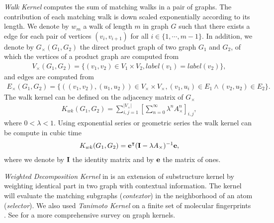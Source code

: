 {%
\textit{Walk Kernel} \citep{Kashima03marginalized,Gartner03a} computes the sum of matching walks in a pair of graphs. 
The contribution of each matching walk is down scaled exponentially according to its length.  
We denote by $w_m$ a walk of length $m$ in graph $G$ such that there exists a edge for each pair of vertices $(v_i,v_{i+1})$ for all $i\in\{1,\cdots,m-1\}$.
In addition, we denote by $G_{\times}(G_1,G_2)$ the direct product graph of two graph $G_1$ and $G_2$, of which the vertices of a product graph are computed from 
\begin{align*}
	V_{\times}(G_1,G_2) = \{(v_1,v_2)\in V_1\times V_2, label(v_1)=label(v_2)\},
\end{align*}
and edges are computed from
\begin{align*}
	E_{\times}(G_1,G_2) = \{((v_1,v_2),(u_1,u_2))\in V_{\times}\times V_{\times},(v_1,u_i)\in E_1\wedge (v_2,u_2)\in E_2\}.
\end{align*}
The walk kernel can be defined on the adjacency matrix of $G_{\times}$
\begin{align*}
	K_{wk}(G_1,G_2) = \sum_{i,j=1}^{|V_{\times}|}\left[\sum_{n=0}^{\infty}\lambda^{n}A_{\times}^n\right]_{i,j},
\end{align*}
where $0<\lambda<1$.
Using exponential series or geometric series the walk kernel can be compute in cubic time \citep{Gartner03a}
\begin{align*}
	K_{wk}(G_1,G_2) = \mathbf {e}^{\intercal}(\mathbf{I}-\lambda A_{\times})^{-1}\mathbf {e},
\end{align*}
where we denote by $\mathbf{I}$ the identity matrix and by $\mathbf {e}$ the matrix of ones.

\textit{Weighted Decomposition Kernel} in \citep{Menchetti05weighted,Ceroni08classification} is an extension of substructure kernel \citep{Haussler99convolution} by weighting identical part in two graph with contextual information.
The kernel will evaluate the matching subgraphs (\textit{contextor}) in the neighborhood of an atom (\textit{selector}).
We also used \textit{Tanimoto Kernel} \citep{Ralaivola05graph} on a finite set of molecular fingerprints \citep{Wang09pubchem}.
See \citep{Vishwanathan10graph} for a more comprehensive survey on graph kernels.

}
